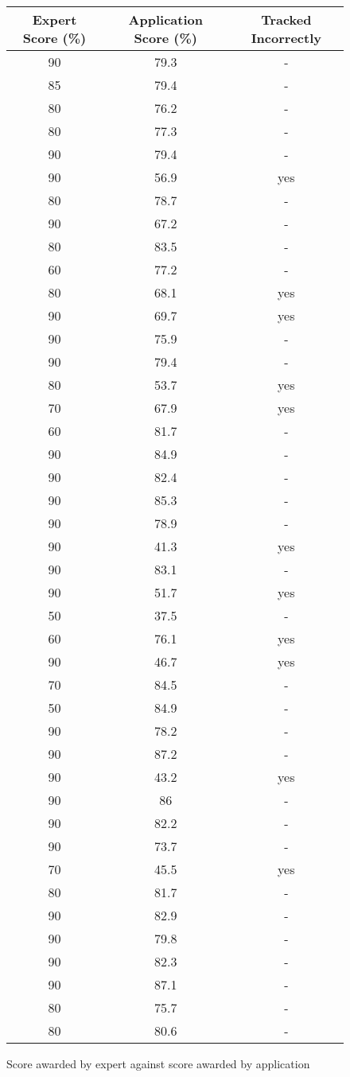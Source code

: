 \begin{figure}[H]
    \centering
	\begin{tabular}{ | c | c | c | }
	    \hline
	    \textbf{Expert Score (\%)} & \textbf{Application Score (\%)} & \textbf{Tracked Incorrectly} \\ \hline
	    90 & 79.3 & - \\ \hline
		85 & 79.4 & - \\ \hline
		80 & 76.2 & - \\ \hline
		80 & 77.3 & - \\ \hline
		90 & 79.4 & - \\ \hline
		90 & 56.9 & yes \\ \hline
		80 & 78.7 & - \\ \hline
		90 & 67.2 & - \\ \hline
		80 & 83.5 & - \\ \hline
		60 & 77.2 & - \\ \hline
		80 & 68.1 & yes \\ \hline
		90 & 69.7 & yes \\ \hline
		90 & 75.9 & - \\ \hline
		90 & 79.4 & - \\ \hline
		80 & 53.7 & yes \\ \hline
		70 & 67.9 & yes \\ \hline
		60 & 81.7 & - \\ \hline
		90 & 84.9 & - \\ \hline
		90 & 82.4 & - \\ \hline
		90 & 85.3 & - \\ \hline
		90 & 78.9 & - \\ \hline
		90 & 41.3 & yes \\ \hline
		90 & 83.1 & - \\ \hline
		90 & 51.7 & yes \\ \hline
		50 & 37.5 & - \\ \hline
		60 & 76.1 & yes \\ \hline
		90 & 46.7 & yes \\ \hline
		70 & 84.5 & - \\ \hline
		50 & 84.9 & - \\ \hline
		90 & 78.2 & - \\ \hline
		90 & 87.2 & - \\ \hline
		90 & 43.2 & yes \\ \hline
		90 & 86 & - \\ \hline
		90 & 82.2 & - \\ \hline
		90 & 73.7 & - \\ \hline
		70 & 45.5 & yes \\ \hline
		80 & 81.7 & - \\ \hline
		90 & 82.9 & - \\ \hline
		90 & 79.8 & - \\ \hline
		90 & 82.3 & - \\ \hline
		90 & 87.1 & - \\ \hline
		80 & 75.7 & - \\ \hline
		80 & 80.6 & - \\ \hline 
    \end{tabular}
\caption{Score awarded by expert against score awarded by application}
\label{fig:analysisevalscores2}
\end{figure}